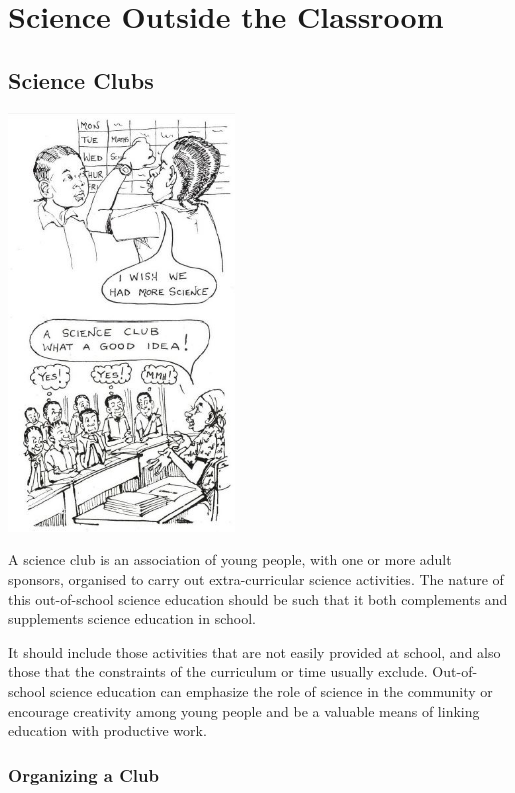 \chapter{Science Outside the Classroom}

\begin{multicols}{2}

\section{Science Clubs} 

\begin{center}
\includegraphics[width=0.45\textwidth]{./img/source/science-clubs.jpg}
\end{center}

A science club is an association of young
people, with one or more adult sponsors,
organised to carry out extra-curricular science
activities. The nature of this out-of-school
science education should be such that it both
complements and supplements science
education in school. 

It should include those
activities that are not easily provided at school,
and also those that the constraints of the
curriculum or time usually exclude. Out-of-school
science education can emphasize the
role of science in the community or encourage
creativity among young people and be a valuable
means of linking education with productive
work.


\subsection{Organizing a Club}


\end{multicols}
